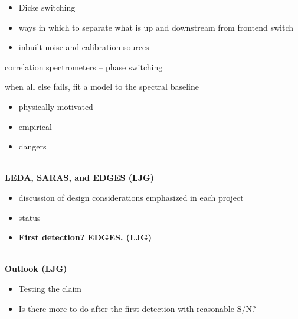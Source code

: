 \begin{itemize}
\item
  Dicke switching
\item
  ways in which to separate what is up and downstream from frontend
  switch
\item
  inbuilt noise and calibration sources
\end{itemize}

correlation spectrometers -- phase switching

when all else fails, fit a model to the spectral baseline

\begin{itemize}
\item
  physically motivated
\item
  empirical
\item
  dangers
\end{itemize}

\emph{}\\

\textbf{LEDA, SARAS, and EDGES (LJG)}

\begin{itemize}
\item
  discussion of design considerations emphasized in each project
\item
  status
\end{itemize}

\begin{itemize}
\item
  \textbf{First detection? EDGES. (LJG)}
\end{itemize}

\textbf{}\\

\textbf{Outlook (LJG)}

\begin{itemize}
\item
  Testing the claim
\item
  Is there more to do after the first detection with reasonable S/N?
\end{itemize}






